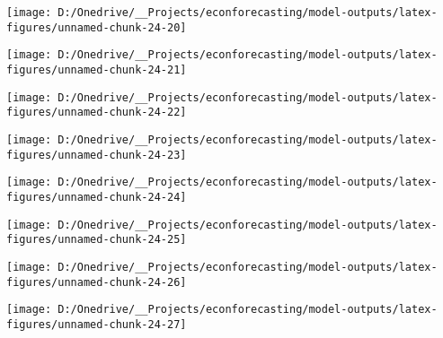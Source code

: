 \documentclass[11pt, letterpaper]{article}\usepackage[]{graphicx}\usepackage[]{color}
\begin{document}
{\centering \texttt{[image: D:/Onedrive/\_\_Projects/econforecasting/model-outputs/latex-figures/unnamed-chunk-24-20]} 

}




{\centering \texttt{[image: D:/Onedrive/\_\_Projects/econforecasting/model-outputs/latex-figures/unnamed-chunk-24-21]} 

}




{\centering \texttt{[image: D:/Onedrive/\_\_Projects/econforecasting/model-outputs/latex-figures/unnamed-chunk-24-22]} 

}




{\centering \texttt{[image: D:/Onedrive/\_\_Projects/econforecasting/model-outputs/latex-figures/unnamed-chunk-24-23]} 

}




{\centering \texttt{[image: D:/Onedrive/\_\_Projects/econforecasting/model-outputs/latex-figures/unnamed-chunk-24-24]} 

}




{\centering \texttt{[image: D:/Onedrive/\_\_Projects/econforecasting/model-outputs/latex-figures/unnamed-chunk-24-25]} 

}




{\centering \texttt{[image: D:/Onedrive/\_\_Projects/econforecasting/model-outputs/latex-figures/unnamed-chunk-24-26]} 

}




{\centering \texttt{[image: D:/Onedrive/\_\_Projects/econforecasting/model-outputs/latex-figures/unnamed-chunk-24-27]} 

}
\end{document}
